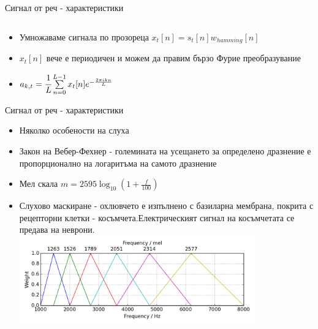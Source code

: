 \documentclass[9pt]{beamer}
\newcommand{\B}[1]{\left(#1\right)}
\begin{document}
\begin{frame}[t]{Сигнал от реч - характеристики}
\begin{columns}[t]
\begin{column}{0.48\textwidth}
            \end{column}
        \end{columns}
        \pause
        \begin{itemize}
            \item Умножаваме сигнала по прозореца $x_t[n] = s_t[n]w_{hamming}[n]$
            \pause
            \item $x_t[n]$ вече е периодичен и можем да правим бързо Фурие преобразувание
            \pause
            \item $a_{k, t} = \cfrac{1}{L} \sum\limits_{n=0}^{L-1} x_t[n] e^{-\frac{2\pi i k n}{L}}$
        \end{itemize}
    \end{frame}

    
    \begin{frame}[t]{Сигнал от реч - характеристики}
        \pause
        \begin{itemize}
            \item Няколко особености на слуха
            \pause
            \item Закон на Вебер-Фехнер
            \pause - големината на усещането за определено дразнение е пропорционално на логаритъма на самото дразнение
            \pause
            \item Мел скала
            \pause $m = 2595 \log_{10}\B{1 + \frac{f}{100}}$
            \pause
            \item Слухово маскиране
            \pause - охлювчето е изпълнено с базиларна мембрана, покрита с рецепторни клетки - косъмчета.\pause  Електрическият сигнал на косъмчетата се предава на неврони.
            \pause
            \includegraphics[width=0.8\textwidth]{mel_filterbank}%
        \end{itemize}
    \end{frame}
\end{document}
